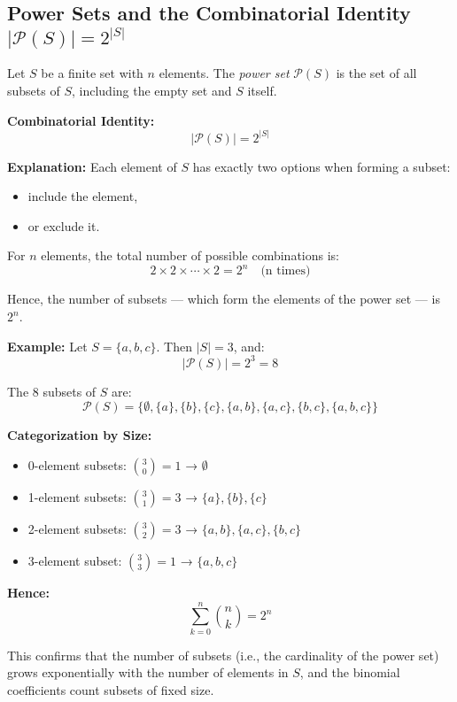\documentclass[10pt]{article}
\theoremstyle{plain}
\theoremstyle{definition}
\begin{document}
	\subsection*{Power Sets and the Combinatorial Identity \( |\mathcal{P}(S)| = 2^{|S|} \)}
	
	Let \( S \) be a finite set with \( n \) elements. The \emph{power set} \( \mathcal{P}(S) \) is the set of all subsets of \( S \), including the empty set and \( S \) itself.
	
	\textbf{Combinatorial Identity:}
	\[
	|\mathcal{P}(S)| = 2^{|S|}
	\]
	
	\textbf{Explanation:}  
	Each element of \( S \) has exactly two options when forming a subset:
	\begin{itemize}
		\item include the element,
		\item or exclude it.
	\end{itemize}
	
	For \( n \) elements, the total number of possible combinations is:
	\[
	2 \times 2 \times \cdots \times 2 = 2^n \quad \text{(n times)}
	\]
	
	Hence, the number of subsets — which form the elements of the power set — is \( 2^n \).
	
	\textbf{Example:}  
	Let \( S = \{a, b, c\} \). Then \( |S| = 3 \), and:
	\[
	|\mathcal{P}(S)| = 2^3 = 8
	\]
	
	The 8 subsets of \( S \) are:
	\[
	\mathcal{P}(S) = \{\emptyset, \{a\}, \{b\}, \{c\}, \{a,b\}, \{a,c\}, \{b,c\}, \{a,b,c\} \}
	\]
	
	\textbf{Categorization by Size:}
	\begin{itemize}
		\item 0-element subsets: \( \binom{3}{0} = 1 \) → \( \emptyset \)
		\item 1-element subsets: \( \binom{3}{1} = 3 \) → \( \{a\}, \{b\}, \{c\} \)
		\item 2-element subsets: \( \binom{3}{2} = 3 \) → \( \{a,b\}, \{a,c\}, \{b,c\} \)
		\item 3-element subset: \( \binom{3}{3} = 1 \) → \( \{a,b,c\} \)
	\end{itemize}
	
	\textbf{Hence:}
	\[
	\sum_{k=0}^n \binom{n}{k} = 2^n
	\]
	
	This confirms that the number of subsets (i.e., the cardinality of the power set) grows exponentially with the number of elements in \( S \), and the binomial coefficients count subsets of fixed size.
	
\end{document}
